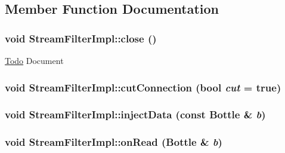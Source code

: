 \subsection{Member Function Documentation}
\hypertarget{classyarp_1_1os_1_1impl_1_1_stream_filter_impl_afe2c98307b0051805788c690b160b977}{
\subsubsection[{close}]{\setlength{\rightskip}{0pt plus 5cm}void StreamFilterImpl::close ()}}
\label{classyarp_1_1os_1_1impl_1_1_stream_filter_impl_afe2c98307b0051805788c690b160b977}
\begin{Desc}
\item[\hyperlink{todo__todo000006}{Todo}]Document \end{Desc}
\hypertarget{classyarp_1_1os_1_1impl_1_1_stream_filter_impl_a9a7a37fe9ac8b71cc7a6a54a118617fc}{
\subsubsection[{cutConnection}]{\setlength{\rightskip}{0pt plus 5cm}void StreamFilterImpl::cutConnection (bool {\em cut} = {\ttfamily true})}}
\label{classyarp_1_1os_1_1impl_1_1_stream_filter_impl_a9a7a37fe9ac8b71cc7a6a54a118617fc}
\hypertarget{classyarp_1_1os_1_1impl_1_1_stream_filter_impl_a114406a0f5eb4ae4c002a76f998e89b2}{
\subsubsection[{injectData}]{\setlength{\rightskip}{0pt plus 5cm}void StreamFilterImpl::injectData (const Bottle \& {\em b})}}
\label{classyarp_1_1os_1_1impl_1_1_stream_filter_impl_a114406a0f5eb4ae4c002a76f998e89b2}
\hypertarget{classyarp_1_1os_1_1impl_1_1_stream_filter_impl_a9ffe25ea43e69bcc50d3334fea26fff5}{
\subsubsection[{onRead}]{\setlength{\rightskip}{0pt plus 5cm}void StreamFilterImpl::onRead (Bottle \& {\em b})}}
